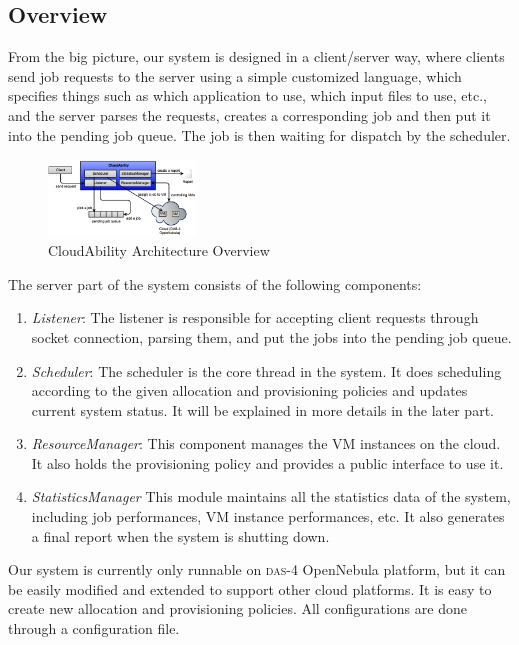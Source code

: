 \subsection{Overview}
From the big picture, our system is designed in a client/server way,
where clients send job requests to the server using a simple
customized language, which specifies things such as which application
to use, which input files to use, etc., and the server parses the
requests, creates a corresponding job and then put it into the pending
job queue. The job is then waiting for dispatch by the scheduler.

\begin{figure}[!t]
\centering
\includegraphics[width=0.35\textwidth]{pictures/system-arch.png}
\caption{CloudAbility Architecture Overview}
\label{figure_system_arch}
\end{figure}

The server part of the system consists of the following components:

\begin{enumerate}
\item\emph{Listener}:
The listener is responsible for accepting client requests through
socket connection, parsing them, and put the jobs into the pending job
queue.
\item\emph{Scheduler}:
The scheduler is the core thread in the system. It does scheduling
according to the given allocation and provisioning policies and
updates current system status. It will be explained in more details in
the later part.
\item\emph{ResourceManager}: 
This component manages the VM instances on the cloud. It also holds the
provisioning policy and provides a public interface to use it.
\item\emph{StatisticsManager} 
This module maintains all the statistics data of the system, including
job performances, VM instance performances, etc. It also generates a
final report when the system is shutting down.
\end{enumerate}

Our system is currently only runnable on \textsc{das-4} OpenNebula
platform, but it can be easily modified and extended to support other
cloud platforms. It is easy to create new allocation and provisioning
policies. All configurations are done through a configuration file.



